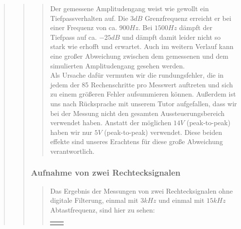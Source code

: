 \begin{quote}
\begin{quote}
\begin{quote}
            Der gemessene Amplitudengang weist wie gewollt ein Tiefpassverhalten auf. Die $3dB$ Grenzfrequenz erreicht
            er bei einer Frequenz von ca. $900 Hz$. Bei $1500 Hz$ dämpft der Tiefpass auf ca. $-25 dB$ und dämpft damit
            leider nicht so stark wie erhofft und erwartet. Auch im weitern Verlauf kann eine großer Abweichung zwischen
            dem gemessenen und dem simulierten Amplitudengang gesehen werden.\\
            Als Ursache dafür vermuten wir die rundungsfehler, die in jedem der 85 Rechenschritte pro Messwert auftreten
            und sich zu einem größeren Fehler aufsummieren können. Außerdem ist uns nach Rücksprache mit unserem
            Tutor aufgefallen, dass wir bei der Messung nicht den gesamten Aussteuerungsbereich verwendet haben. Anstatt der möglichen $14V$ (peak-to-peak) haben wir nur $5V$
            (peak-to-peak) verwendet. Diese beiden effekte sind unseres Erachtens für diese große Abweichung
            verantwortlich.
            
    	\end{quote}
    	
    	
    	\subsubsection{Aufnahme von zwei Rechtecksignalen}
    	\begin{quote}
    	
    	Das Ergebnis der Messungen von zwei Rechtecksignalen ohne digitale
    	Filterung, einmal mit $3kHz$ und einmal mit $15kHz$ Abtastfrequenz, sind
    	hier zu sehen:
    	
    	 \begin{center}
                \begin{tabular}{ll}
    
                \hspace{-12em}
                    \begin{minipage}{0.6\textwidth}
    

\end{minipage}
\end{tabular}
\end{center}
\end{quote}
\end{quote}
\end{quote}
